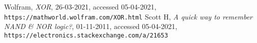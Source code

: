 \documentclass{article}
\begin{document}
    \begin{thebibliography}{10}
        Wolfram, \textit{XOR}, 26-03-2021, accessed 05-04-2021, \\\texttt{https://mathworld.wolfram.com/XOR.html}
        Scott H, \textit{A quick way to remember NAND \& NOR logic?}, 01-11-2011, accessed 05-04-2021, \\\texttt{https://electronics.stackexchange.com/a/21653}
    \end{thebibliography}
\end{document}
